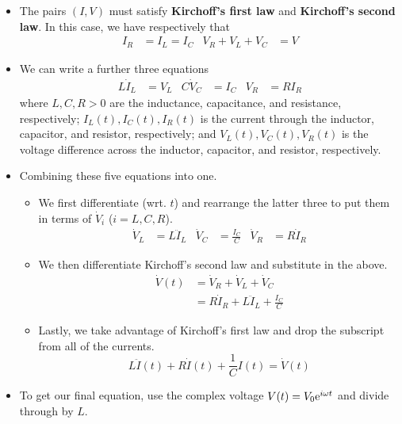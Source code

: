 \documentclass[../notes.tex]{subfiles}
\begin{document}
\begin{itemize}
\begin{itemize}
        \item The pairs $(I,V)$ must satisfy \textbf{Kirchoff's first law} and \textbf{Kirchoff's second law}. In this case, we have respectively that
        \begin{align*}
            I_R &= I_L = I_C&
            V_R+V_L+V_C &= V
        \end{align*}
        \item We can write a further three equations
        \begin{align*}
            L\dot{I}_L &= V_L&
            C\dot{V}_C &= I_C&
            V_R &= RI_R
        \end{align*}
        where $L,C,R>0$ are the inductance, capacitance, and resistance, respectively; $I_L(t),I_C(t),I_R(t)$ is the current through the inductor, capacitor, and resistor, respectively; and $V_L(t),V_C(t),V_R(t)$ is the voltage difference across the inductor, capacitor, and resistor, respectively.
        \item Combining these five equations into one.
        \begin{itemize}
            \item We first differentiate (wrt. $t$) and rearrange the latter three to put them in terms of $\dot{V}_i$ ($i=L,C,R$).
            \begin{align*}
                \dot{V}_L &= L\ddot{I}_L&
                \dot{V}_C &= \frac{I_C}{C}&
                \dot{V}_R &= R\dot{I}_R
            \end{align*}
            \item We then differentiate Kirchoff's second law and substitute in the above.
            \begin{align*}
                \dot{V}(t) &= \dot{V}_R+\dot{V}_L+\dot{V}_C\\
                &= R\dot{I}_R+L\ddot{I}_L+\frac{I_C}{C}
            \end{align*}
            \item Lastly, we take advantage of Kirchoff's first law and drop the subscript from all of the currents.
            \begin{equation*}
                L\ddot{I}(t)+R\dot{I}(t)+\frac{1}{C}I(t) = \dot{V}(t)
            \end{equation*}
        \end{itemize}
        \item To get our final equation, use the complex voltage $V(t)=V_0\e[i\omega t]$ and divide through by $L$.
        \begin{equation*}

\end{equation*}
\end{itemize}
\end{itemize}
\end{document}
